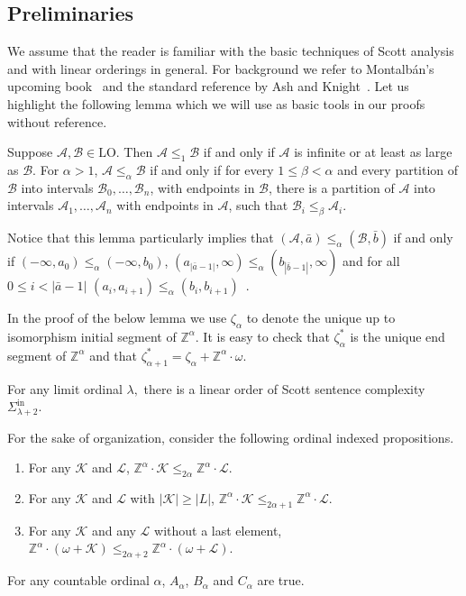 \documentclass[10pt,a4paper]{amsart}
\providecommand{\tightlist}{%
  \setlength{\itemsep}{0pt}\setlength{\parskip}{0pt}}
\providecommand{\A}{\mathcal{A}}
\providecommand{\L}{\mathcal{L}}
\providecommand{\B}{\mathcal{B}}
\providecommand{\Sinf}[1]{\Sigma^{\mathrm{in}}_{#1}}
\providecommand{\ba}{\bar a}
\providecommand{\bb}{\bar b}
\providecommand{\LO}{\mathrm{LO}}
\newcommand{\Z}{\mathbb{Z}}
\newcommand{\K}{\mathcal{K}}
\renewcommand{\L}{\mathcal{L}}
\begin{document}
\subsection{Preliminaries}
We assume that the reader is familiar with the basic techniques of Scott
analysis and with linear orderings in general. For background we refer to
Montalb\'an's upcoming book~\cite{montalban2021} and the standard reference by
Ash and Knight~\cite{ash2000}. Let us highlight the following lemma
which we will use as basic tools in our proofs without reference.
\begin{lemma}\label{lem:bfandpartitions}  Suppose $\A,\B\in\LO$. Then $\A\leq_1 \B$ if and only if $\A$ is infinite or at least as large as $\B$. For $\alpha>1$, $\A\leq_\alpha \B$ if and only if for every $1\leq\beta<\alpha$ and every partition of $\B$ into intervals $\B_0,\dots,\B_n$, with endpoints in $\B$, there is a partition of $\A$ into intervals $\A_1,\dots,\A_n$ with endpoints in $\A$, such that $\B_i\leq_\beta \A_i$.
\end{lemma}
Notice that this lemma particularly implies that $(\A,\ba)\leq_\alpha (\B,\bb)$
if and only if $(-\infty, a_0)\leq_\alpha (-\infty, b_0)$,
$(a_{|\ba-1|},\infty)\leq_\alpha (b_{|\bb-1|},\infty)$ and for all $0\leq
i<|\ba-1|$ $(a_i,a_{i+1})\leq_\alpha (b_i,b_{i+1})$~\cite[Lemma 15.7]{ash2000}.

In the proof of the below lemma we use $\zeta_\alpha$ to denote the unique up to
isomorphism initial segment of $\Z^\alpha$. 
It is easy to check that $\zeta_\alpha^*$ is the unique end segment of  $\Z^\alpha$ and that $\zeta_{\alpha+1}^*=\zeta_\alpha+\Z^\alpha\cdot\omega$. 

\begin{theorem}\label{thm:Slim+2}
For any limit ordinal $\lambda,$ there is a linear order of Scott sentence
complexity $\Sinf{\lambda+2}.$
\end{theorem}

\begin{lemma}\label{lem:timesZ}
For the sake of organization, consider the following ordinal indexed propositions.
\begin{enumerate}\tightlist
\item[($A_\alpha$)] For any $\K$ and $\L$, $\Z^\alpha\cdot \K
    \leq_{2\alpha}\Z^\alpha\cdot \L$.
\item[($B_\alpha$)] For any $\K$ and $\L$ with $|\K|\geq|L|$, $\Z^\alpha\cdot \K
    \leq_{2\alpha+1}\Z^\alpha\cdot \L$.
\item[($C_\alpha$)] For any $\K$ and any $\L$ without a last element,
    $\Z^\alpha\cdot(\omega+\K)\leq_{2\alpha+2} \Z^\alpha\cdot(\omega+\L)$.
\end{enumerate}
For any countable ordinal $\alpha$, $A_\alpha$, $B_\alpha$ and $C_\alpha$ are true.
\end{lemma}
\end{document}
